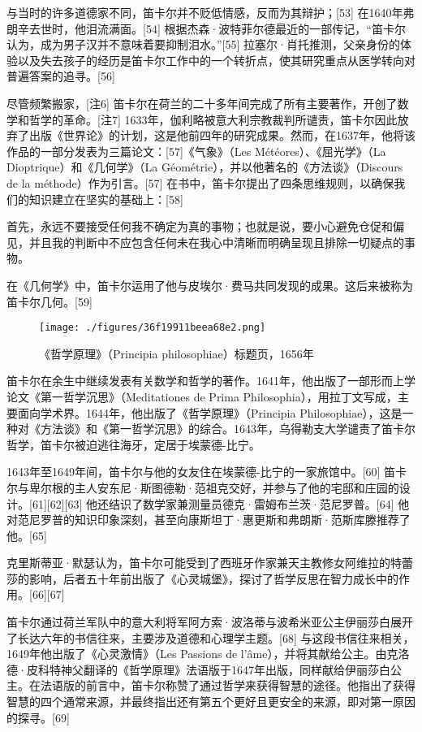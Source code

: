 与当时的许多道德家不同，笛卡尔并不贬低情感，反而为其辩护；[53] 在1640年弗朗辛去世时，他泪流满面。[54] 根据杰森·波特菲尔德最近的一部传记，“笛卡尔认为，成为男子汉并不意味着要抑制泪水。”[55] 拉塞尔·肖托推测，父亲身份的体验以及失去孩子的经历是笛卡尔工作中的一个转折点，使其研究重点从医学转向对普遍答案的追寻。[56]

尽管频繁搬家，[注6] 笛卡尔在荷兰的二十多年间完成了所有主要著作，开创了数学和哲学的革命。[注7] 1633年，伽利略被意大利宗教裁判所谴责，笛卡尔因此放弃了出版《世界论》的计划，这是他前四年的研究成果。然而，在1637年，他将该作品的一部分发表为三篇论文：[57]《气象》（Les Météores）、《屈光学》（La Dioptrique）和《几何学》（La Géométrie），并以他著名的《方法谈》（Discours de la méthode）作为引言。[57] 在书中，笛卡尔提出了四条思维规则，以确保我们的知识建立在坚实的基础上：[58]

首先，永远不要接受任何我不确定为真的事物；也就是说，要小心避免仓促和偏见，并且我的判断中不应包含任何未在我心中清晰而明确呈现且排除一切疑点的事物。

在《几何学》中，笛卡尔运用了他与皮埃尔·费马共同发现的成果。这后来被称为笛卡尔几何。[59]
\begin{figure}[ht]
\centering
\texttt{[image: ./figures/36f19911beea68e2.png]}
\caption{《哲学原理》（Principia philosophiae）标题页，1656年} \label{fig_DKE_5}
\end{figure}

笛卡尔在余生中继续发表有关数学和哲学的著作。1641年，他出版了一部形而上学论文《第一哲学沉思》（Meditationes de Prima Philosophia），用拉丁文写成，主要面向学术界。1644年，他出版了《哲学原理》（Principia Philosophiae），这是一种对《方法谈》和《第一哲学沉思》的综合。1643年，乌得勒支大学谴责了笛卡尔哲学，笛卡尔被迫逃往海牙，定居于埃蒙德-比宁。

1643年至1649年间，笛卡尔与他的女友住在埃蒙德-比宁的一家旅馆中。[60] 笛卡尔与卑尔根的主人安东尼·斯图德勒·范祖克交好，并参与了他的宅邸和庄园的设计。[61][62][63] 他还结识了数学家兼测量员德克·雷姆布兰茨·范尼罗普。[64] 他对范尼罗普的知识印象深刻，甚至向康斯坦丁·惠更斯和弗朗斯·范斯库滕推荐了他。[65]

克里斯蒂亚·默瑟认为，笛卡尔可能受到了西班牙作家兼天主教修女阿维拉的特蕾莎的影响，后者五十年前出版了《心灵城堡》，探讨了哲学反思在智力成长中的作用。[66][67]

笛卡尔通过荷兰军队中的意大利将军阿方索·波洛蒂与波希米亚公主伊丽莎白展开了长达六年的书信往来，主要涉及道德和心理学主题。[68] 与这段书信往来相关，1649年他出版了《心灵激情》（Les Passions de l'âme），并将其献给公主。由克洛德·皮科特神父翻译的《哲学原理》法语版于1647年出版，同样献给伊丽莎白公主。在法语版的前言中，笛卡尔称赞了通过哲学来获得智慧的途径。他指出了获得智慧的四个通常来源，并最终指出还有第五个更好且更安全的来源，即对第一原因的探寻。[69]

